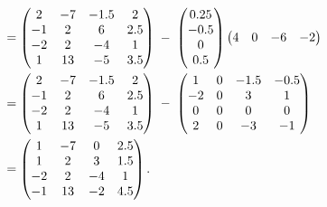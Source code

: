 
\begin{align}
&= \begin{pmatrix} 2 & -7 & -1.5 & 2\\ -1 & 2 & 6 & 2.5\\ -2 & 2 & -4 & 1\\ 1 & 13 & -5 & 3.5 \end{pmatrix}
\;-\;
\begin{pmatrix} 0.25\\ -0.5\\ 0\\ 0.5 \end{pmatrix}
\begin{pmatrix} 4 & 0 & -6 & -2 \end{pmatrix} \notag\\
&= \begin{pmatrix} 2 & -7 & -1.5 & 2\\ -1 & 2 & 6 & 2.5\\ -2 & 2 & -4 & 1\\ 1 & 13 & -5 & 3.5 \end{pmatrix}
\;-\;
\begin{pmatrix} 1 & 0 & -1.5 & -0.5\\ -2 & 0 & 3 & 1\\ 0 & 0 & 0 & 0\\ 2 & 0 & -3 & -1 \end{pmatrix} \notag\\
&= \begin{pmatrix} 1 & -7 & 0 & 2.5\\ 1 & 2 & 3 & 1.5\\ -2 & 2 & -4 & 1\\ -1 & 13 & -2 & 4.5 \end{pmatrix}.
\end{align}

